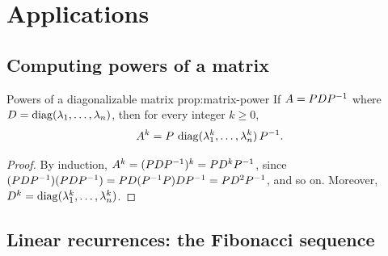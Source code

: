 \section{Applications}\label{sec:eigen-applications}

\subsection{Computing powers of a matrix}\label{subsec:matrix-powers}

\begin{proposition}{Powers of a diagonalizable matrix}%
{prop:matrix-power}
If $A = P D {P}^{-1}$ where $D = \operatorname{diag}(\lambda_1,\ldots,\lambda_n)$,
then for every integer $k\geq 0$,
\[
  A^k = P\,\operatorname{diag}(\lambda_1^k,\ldots,\lambda_n^k)\,{P}^{-1}.
\]
\end{proposition}

\begin{proof}
By induction, $A^k = (PD{P}^{-1})^k = PD^k{P}^{-1}$, since
$(PD{P}^{-1})(PD{P}^{-1}) = PD({P}^{-1}P)D{P}^{-1} = PD^2{P}^{-1}$,
and so on.  Moreover, $D^k = \operatorname{diag}(\lambda_1^k,\ldots,\lambda_n^k)$.
\end{proof}

\subsection{Linear recurrences: the Fibonacci sequence}%
\label{subsec:fibonacci}

